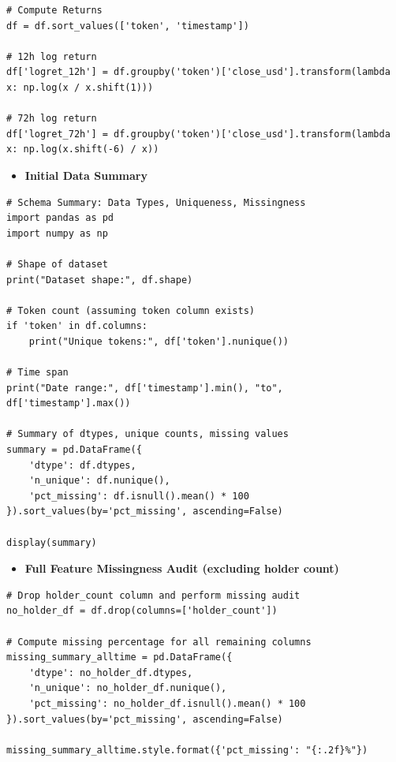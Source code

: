 \documentclass[
  a4paper,
  DIV=11,
  numbers=noendperiod]{scrreprt}
\providecommand{\tightlist}{%
  \setlength{\itemsep}{0pt}\setlength{\parskip}{0pt}}
\begin{document}
\begin{verbatim}
# Compute Returns
df = df.sort_values(['token', 'timestamp'])

# 12h log return
df['logret_12h'] = df.groupby('token')['close_usd'].transform(lambda x: np.log(x / x.shift(1)))

# 72h log return
df['logret_72h'] = df.groupby('token')['close_usd'].transform(lambda x: np.log(x.shift(-6) / x))
\end{verbatim}

\begin{itemize}
\tightlist
\item
  \textbf{Initial Data Summary}
\end{itemize}

\begin{verbatim}
# Schema Summary: Data Types, Uniqueness, Missingness
import pandas as pd
import numpy as np

# Shape of dataset
print("Dataset shape:", df.shape)

# Token count (assuming token column exists)
if 'token' in df.columns:
    print("Unique tokens:", df['token'].nunique())

# Time span
print("Date range:", df['timestamp'].min(), "to", df['timestamp'].max())

# Summary of dtypes, unique counts, missing values
summary = pd.DataFrame({
    'dtype': df.dtypes,
    'n_unique': df.nunique(),
    'pct_missing': df.isnull().mean() * 100
}).sort_values(by='pct_missing', ascending=False)

display(summary)
\end{verbatim}

\begin{itemize}
\tightlist
\item
  \textbf{Full Feature Missingness Audit (excluding holder count)}
\end{itemize}

\begin{verbatim}
# Drop holder_count column and perform missing audit
no_holder_df = df.drop(columns=['holder_count'])

# Compute missing percentage for all remaining columns
missing_summary_alltime = pd.DataFrame({
    'dtype': no_holder_df.dtypes,
    'n_unique': no_holder_df.nunique(),
    'pct_missing': no_holder_df.isnull().mean() * 100
}).sort_values(by='pct_missing', ascending=False)

missing_summary_alltime.style.format({'pct_missing': "{:.2f}%"})
\end{verbatim}
\end{document}
